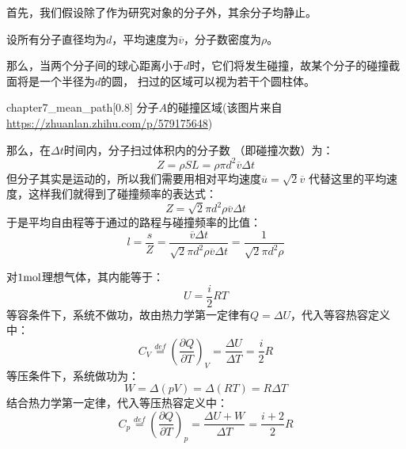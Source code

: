 \begin{prove}
    首先，我们假设除了作为研究对象的分子外，其余分子均静止。

    设所有分子直径均为$d$，平均速度为$\overline{v}$，分子数密度为$\rho$。

    那么，当两个分子间的球心距离小于$d$时，它们将发生碰撞，故某个分子的碰撞截面将是一个半径为$d$的圆，
    扫过的区域可以视为若干个圆柱体。
    \begin{singlefigure}{chapter7_mean_path}[0.8]
        分子$A$的碰撞区域(该图片来自\url{https://zhuanlan.zhihu.com/p/579175648})
    \end{singlefigure}
    那么，在$\Delta t$时间内，分子扫过体积内的分子数 （即碰撞次数）为：
    \begin{equation}
        Z =\rho SL =\rho \pi d^{2} \overline{v} \Delta t
        \nonumber
    \end{equation}
    但分子其实是运动的，所以我们需要用相对平均速度$\overline{u} = \sqrt{2}\overline{v}$
    代替这里的平均速度，这样我们就得到了碰撞频率的表达式：
    \begin{equation}
        Z =\sqrt{2}\pi d^{2} \rho \overline{v} \Delta t
    \end{equation}
    于是平均自由程等于通过的路程与碰撞频率的比值：
    \begin{equation}
        l = \frac{s}{Z} = \frac{\overline{v}\Delta t }{\sqrt{2}\pi d^{2} \rho \overline{v} \Delta t} = \frac{1}{\sqrt{2}\pi d^{2} \rho}
    \end{equation}
\end{prove}
\begin{prove}
    对$1\rm{mol}$理想气体，其内能等于：
    \begin{equation}
        U = \frac{i}{2}RT
        \nonumber
    \end{equation}
    等容条件下，系统不做功，故由热力学第一定律有$Q = \Delta U$，代入等容热容定义中：
    \begin{equation}
        C_{V} \overset{def}{=} \left(\frac{\partial{Q}}{\partial{T}}\right)_{V} =\frac{\Delta U}{\Delta T}
        =\frac{i}{2}R
    \end{equation}
    等压条件下，系统做功为：
    \begin{equation}
        W = \Delta (pV) = \Delta (RT) =  R\Delta T
        \nonumber
    \end{equation}
    结合热力学第一定律，代入等压热容定义中：
    \begin{equation}
        C_{p} \overset{def}{=} \left(\frac{\partial{Q}}{\partial{T}}\right)_{p} = \frac{\Delta U + W}{\Delta T}
        = \frac{i+2}{2}R
    \end{equation}
\end{prove}
